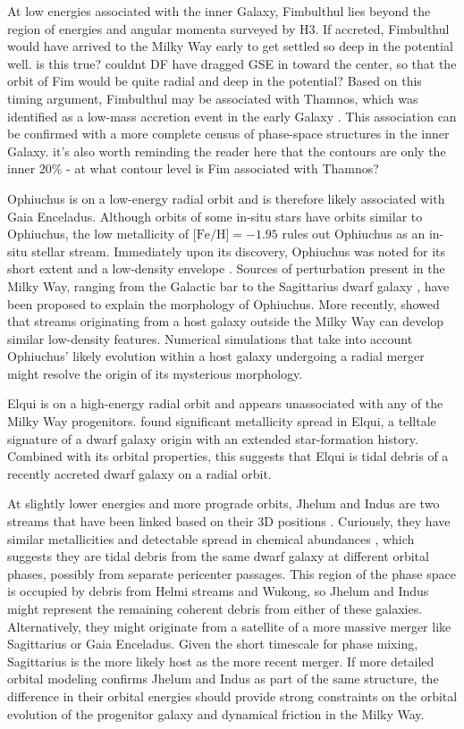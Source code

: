 \documentclass[twocolumn]{aastex63}
\newcommand{\feh}{\ensuremath{\textrm{[Fe/H]}}}
\begin{document}
At low energies associated with the inner Galaxy, Fimbulthul lies beyond the region of energies and angular momenta surveyed by H3.
If accreted, Fimbulthul would have arrived to the Milky Way early to get settled so deep in the potential well. {\color{red} is this true?  couldnt DF have dragged GSE in toward the center, so that the orbit of Fim would be quite radial and deep in the potential?}
Based on this timing argument, Fimbulthul may be associated with Thamnos, which was identified as a low-mass accretion event in the early Galaxy \citep{koppelman2019}.
This association can be confirmed with a more complete census of phase-space structures in the inner Galaxy.  {\color{red} it's also worth reminding the reader here that the contours are only the inner 20\% - at what contour level is Fim associated with Thamnos?}

Ophiuchus is on a low-energy radial orbit and is therefore likely associated with Gaia Enceladus.
Although orbits of some in-situ stars have orbits similar to Ophiuchus, the low metallicity of $\feh=-1.95$ \citep{sesar2015} rules out Ophiuchus as an in-situ stellar stream.
Immediately upon its discovery, Ophiuchus was noted for its short extent and a low-density envelope \citep{bernard2015, sesar2015}.
Sources of perturbation present in the Milky Way, ranging from the Galactic bar \citep{price-whelan2016} to the Sagittarius dwarf galaxy \citep{lane2020}, have been proposed to explain the morphology of Ophiuchus.
More recently, \citet{carlberg2019} showed that streams originating from a host galaxy outside the Milky Way can develop similar low-density features.
Numerical simulations that take into account Ophiuchus' likely evolution within a host galaxy undergoing a radial merger might resolve the origin of its mysterious morphology.

Elqui is on a high-energy radial orbit and appears unassociated with any of the Milky Way progenitors.
\citet{ji2020} found significant metallicity spread in Elqui, a telltale signature of a dwarf galaxy origin with an extended star-formation history.
Combined with its orbital properties, this suggests that Elqui is tidal debris of a recently accreted dwarf galaxy on a radial orbit.

At slightly lower energies and more prograde orbits, Jhelum and Indus are two streams that have been linked based on their 3D positions \citep{bonaca2019b}.
Curiously, they have similar metallicities and detectable spread in chemical abundances \citep{ji2020}, which suggests they are tidal debris from the same dwarf galaxy at different orbital phases, possibly from separate pericenter passages.
This region of the phase space is occupied by debris from Helmi streams and Wukong, so Jhelum and Indus might represent the remaining coherent debris from either of these galaxies.
Alternatively, they might originate from a satellite of a more massive merger like Sagittarius or Gaia Enceladus.
Given the short timescale for phase mixing, Sagittarius is the more likely host as the more recent merger.
If more detailed orbital modeling confirms Jhelum and Indus as part of the same structure, the difference in their orbital energies should provide strong constraints on the orbital evolution of the progenitor galaxy and dynamical friction in the Milky Way.
\end{document}
